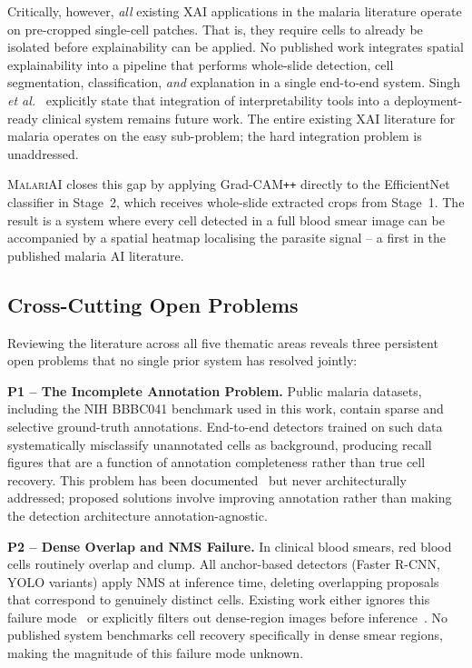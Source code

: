 \documentclass[10pt,twocolumn]{article}
\newcommand{\etal}{\textit{et al.}}
\newcommand{\malariai}{\textsc{MalariAI}}
\begin{document}
Critically, however, \emph{all} existing XAI applications in the
malaria literature operate on pre-cropped single-cell patches. That is,
they require cells to already be isolated before explainability can be
applied. No published work integrates spatial explainability into a
pipeline that performs whole-slide detection, cell segmentation,
classification, \emph{and} explanation in a single end-to-end system.
Singh \etal~\cite{singh2025} explicitly state that integration of
interpretability tools into a deployment-ready clinical system remains
future work. The entire existing XAI literature for malaria operates
on the easy sub-problem; the hard integration problem is unaddressed.

\malariai{} closes this gap by applying Grad-CAM\texttt{++} directly
to the EfficientNet classifier in Stage~2, which receives whole-slide
extracted crops from Stage~1. The result is a system where every
cell detected in a full blood smear image can be accompanied by a
spatial heatmap localising the parasite signal -- a first in the
published malaria AI literature.

\subsection{Cross-Cutting Open Problems}
\label{ssec:gaps}

Reviewing the literature across all five thematic areas reveals three
persistent open problems that no single prior system has resolved jointly:

\textbf{P1 -- The Incomplete Annotation Problem.} Public malaria datasets,
including the NIH BBBC041 benchmark used in this work, contain sparse and
selective ground-truth annotations. End-to-end detectors trained on such
data systematically misclassify unannotated cells as background, producing
recall figures that are a function of annotation completeness rather than
true cell recovery. This problem has been documented~\cite{loh2021,coco_dataset2025}
but never architecturally addressed; proposed solutions involve improving
annotation rather than making the detection architecture annotation-agnostic.

\textbf{P2 -- Dense Overlap and NMS Failure.} In clinical blood smears,
red blood cells routinely overlap and clump. All anchor-based detectors
(Faster R-CNN, YOLO variants) apply NMS at inference time, deleting
overlapping proposals that correspond to genuinely distinct cells.
Existing work either ignores this failure mode~\cite{singh2025,yolov4malaria2024}
or explicitly filters out dense-region images before inference~\cite{loh2021}.
No published system benchmarks cell recovery specifically in dense smear
regions, making the magnitude of this failure mode unknown.
\end{document}

